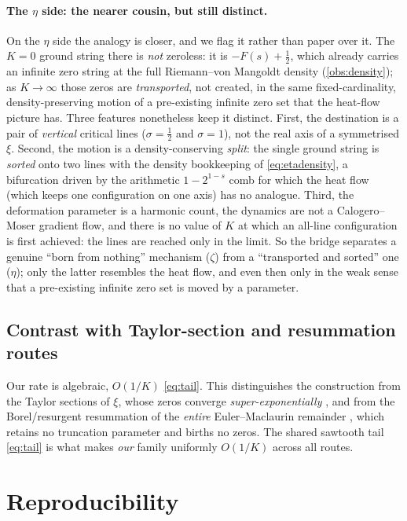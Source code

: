 \documentclass[11pt]{article}
\theoremstyle{definition}
\begin{document}
\paragraph{The $\eta$ side: the nearer cousin, but still distinct.}
On the $\eta$ side the analogy is closer, and we flag it rather than paper over it.
The $K=0$ ground string there is \emph{not} zeroless: it is $-F(s)+\tfrac12$, which
already carries an infinite zero string at the full Riemann--von Mangoldt density
(\cref{obs:density}); as $K\to\infty$ those zeros are \emph{transported}, not
created, in the same fixed-cardinality, density-preserving motion of a pre-existing
infinite zero set that the heat-flow picture has. Three features nonetheless keep
it distinct. First, the destination is a pair of \emph{vertical} critical lines
($\sigma=\tfrac12$ and $\sigma=1$), not the real axis of a symmetrised $\xi$.
Second, the motion is a density-conserving \emph{split}: the single ground string
is \emph{sorted} onto two lines with the density bookkeeping of
\eqref{eq:etadensity}, a bifurcation driven by the arithmetic $1-2^{1-s}$ comb for
which the heat flow (which keeps one configuration on one axis) has no
analogue. Third, the deformation parameter is a harmonic count, the dynamics are
not a Calogero--Moser gradient flow, and there is no value of $K$ at which an
all-line configuration is first achieved: the lines are reached only in the
limit. So the bridge separates a genuine ``born from nothing'' mechanism ($\zeta$)
from a ``transported and sorted'' one ($\eta$); only the latter resembles the heat
flow, and even then only in the weak sense that a pre-existing infinite zero set is
moved by a parameter.

\subsection{Contrast with Taylor-section and resummation routes}
Our rate is algebraic, $O(1/K)$ \eqref{eq:tail}. This distinguishes the
construction from the Taylor sections of $\xi$, whose zeros converge
\emph{super-exponentially} \citep{JenkinsMcLaughlin2016}, and from the
Borel/resurgent resummation of the \emph{entire} Euler--Maclaurin remainder
\citep{CostinGaroufalidis2008}, which retains no truncation parameter and births
no zeros. The shared sawtooth tail \eqref{eq:tail} is what makes \emph{our}
family uniformly $O(1/K)$ across all routes.

\section{Reproducibility}\label{sec:repro}
\end{document}
